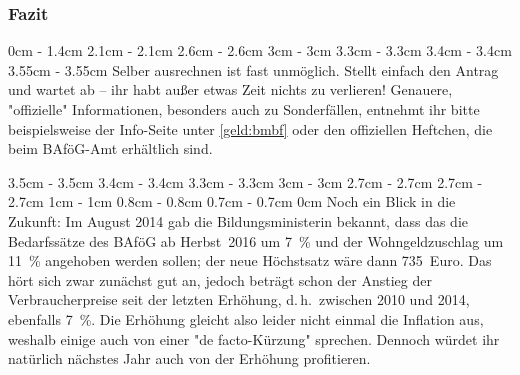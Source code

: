 \begin{multicols*}{2}
\subsubsection*{Fazit}
0cm		\columnwidth
1.4cm	\dimexpr\columnwidth - 1.4cm
2.1cm	\dimexpr\columnwidth - 2.1cm
2.6cm	\dimexpr\columnwidth - 2.6cm
3cm		\dimexpr\columnwidth - 3cm
3.3cm	\dimexpr\columnwidth - 3.3cm
3.4cm	\dimexpr\columnwidth - 3.4cm
3.55cm	\dimexpr\columnwidth - 3.55cm
Selber ausrechnen ist fast unmöglich. Stellt einfach den Antrag und wartet ab -- ihr habt außer etwas Zeit nichts zu verlieren! Genauere, "offizielle" Informationen, besonders auch zu Sonderfällen, entnehmt ihr bitte beispielsweise der Info-Seite unter \cref{geld:bmbf} oder den offiziellen Heftchen, die beim BAföG-Amt erhältlich sind.


3.5cm	\dimexpr\columnwidth - 3.5cm
3.4cm	\dimexpr\columnwidth - 3.4cm
3.3cm	\dimexpr\columnwidth - 3.3cm
3cm		\dimexpr\columnwidth - 3cm
2.7cm	\dimexpr\columnwidth - 2.7cm
2.7cm	\dimexpr\columnwidth - 2.7cm
1cm		\dimexpr\columnwidth - 1cm
0.8cm	\dimexpr\columnwidth - 0.8cm
0.7cm	\dimexpr\columnwidth - 0.7cm
0cm \columnwidth
Noch ein Blick in die Zukunft:
Im August 2014 gab die Bildungsministerin bekannt, dass das die Bedarfssätze des BAföG ab Herbst~2016 um \SI{7}{\percent} und der Wohngeldzuschlag um \SI{11}{\percent} angehoben werden sollen; der neue Höchstsatz wäre dann 735~Euro.
Das hört sich zwar zunächst gut an, jedoch beträgt schon der Anstieg der Verbraucherpreise seit der letzten Erhöhung, d.\,h.\ zwischen 2010 und 2014, ebenfalls \SI{7}{\percent}.
Die Erhöhung gleicht also leider nicht einmal die Inflation aus, weshalb einige auch von einer "de facto-Kürzung" sprechen.
Dennoch würdet ihr natürlich nächstes Jahr auch von der Erhöhung profitieren.


\end{multicols*}
